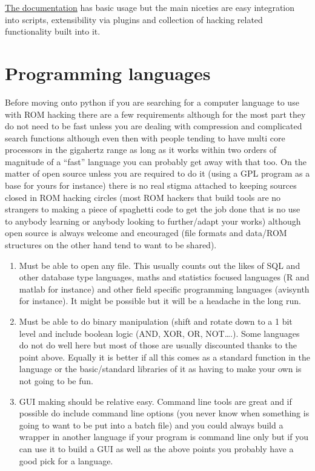 \documentclass[
]{book}
\providecommand{\tightlist}{%
  \setlength{\itemsep}{0pt}\setlength{\parskip}{0pt}}
\begin{document}
\href{http://www.radare.org/y/?p=documentation}{The documentation} has basic usage but the main niceties are easy integration into scripts, extensibility via plugins and collection of hacking related functionality built into it.

\hypertarget{programming-languages}{%
\section{Programming languages}\label{programming-languages}}

Before moving onto python if you are searching for a computer language to use with ROM hacking there are a few requirements although for the most part they do not need to be fast unless you are dealing with compression and complicated search functions although even then with people tending to have multi core processors in the gigahertz range as long as it works within two orders of magnitude of a ``fast'' language you can probably get away with that too. On the matter of open source unless you are required to do it (using a GPL program as a base for yours for instance) there is no real stigma attached to keeping sources closed in ROM hacking circles (most ROM hackers that build tools are no strangers to making a piece of spaghetti code to get the job done that is no use to anybody learning or anybody looking to further/adapt your works) although open source is always welcome and encouraged (file formats and data/ROM structures on the other hand tend to want to be shared).

\begin{enumerate}
\def\labelenumi{\arabic{enumi}.}
\tightlist
\item
  Must be able to open any file. This usually counts out the likes of SQL and other database type languages, maths and statistics focused languages (R and matlab for instance) and other field specific programming languages (avisynth for instance). It might be possible but it will be a headache in the long run.
\item
  Must be able to do binary manipulation (shift and rotate down to a 1 bit level and include boolean logic (AND, XOR, OR, NOT\ldots.). Some languages do not do well here but most of those are usually discounted thanks to the point above. Equally it is better if all this comes as a standard function in the language or the basic/standard libraries of it as having to make your own is not going to be fun.
\item
  GUI making should be relative easy. Command line tools are great and if possible do include command line options (you never know when something is going to want to be put into a batch file) and you could always build a wrapper in another language if your program is command line only but if you can use it to build a GUI as well as the above points you probably have a good pick for a language.
\end{enumerate}
\end{document}
